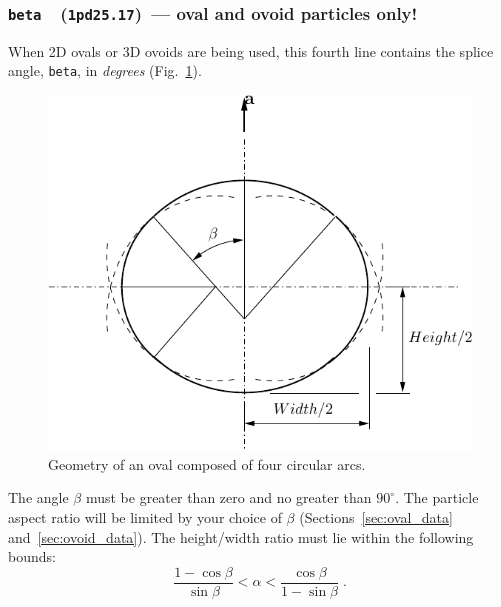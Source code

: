 \documentclass[letterpaper,11pt]{article}
\newcommand{\Var}[2]{\texttt{#1}\ \  (\texttt{#2})}
\begin{document}
\subsubsection[\texttt{beta}]{\Var{beta}{1pd25.17}\ --- oval 
and ovoid particles only!}\label{sec:beta}
When 2D ovals or 3D ovoids are being used, this fourth line contains the
splice angle, \texttt{beta}, in \emph{degrees}
(Fig.~\ref{fig:four_arc}).
\begin{figure}
  \centering
  \includegraphics{Figures/four_arc.pdf}
  \caption{Geometry of an oval composed of four circular arcs.}
  \label{fig:four_arc}
\end{figure}
%
The angle $\beta$ must be greater than zero and no greater than $90^{\circ}$.
The particle aspect ratio will be limited by your choice of $\beta$
(Sections~\ref{sec:oval_data} and~\ref{sec:ovoid_data}).
The height/width ratio must lie within the following bounds:
\begin{equation}
\frac{1-\cos\beta}{\sin\beta} < \alpha <%
\frac{\cos\beta}{1-\sin\beta} \;.
\end{equation}
%
\end{document}
